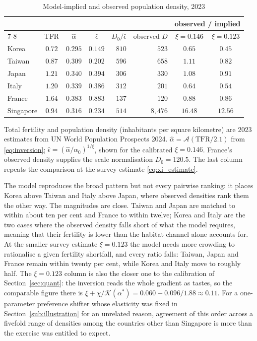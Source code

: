 \documentclass[11pt]{article}
\begin{document}
\begin{table}[h!]\centering
\begin{threeparttable}
\caption{Model-implied and observed population density, 2023}
\label{tab:crosscountry}
\begin{tabular}{lcccrrcc}
\toprule
& & & & & & \multicolumn{2}{c}{observed / implied}\\
\cmidrule(lr){7-8}
& TFR & $\hat\alpha$ & $\hat\epsilon$ & $D_0/\hat\epsilon$ & observed $D$ & $\xi=0.146$ & $\xi=0.123$\\
\midrule
Korea       & $0.72$ & $0.295$ & $0.149$ & $810$ & $523$  & $0.65$ & $0.45$\\
Taiwan      & $0.87$ & $0.309$ & $0.202$ & $596$ & $658$  & $1.11$ & $0.82$\\
Japan       & $1.21$ & $0.340$ & $0.394$ & $306$ & $330$  & $1.08$ & $0.91$\\
Italy       & $1.20$ & $0.339$ & $0.386$ & $312$ & $201$  & $0.64$ & $0.54$\\
France      & $1.64$ & $0.383$ & $0.883$ & $137$ & $120$  & $0.88$ & $0.86$\\
Singapore   & $0.94$ & $0.316$ & $0.234$ & $514$ & $8{,}476$ & $16.48$ & $12.56$\\
\bottomrule
\end{tabular}
\begin{tablenotes}\footnotesize
\item Total fertility and population density (inhabitants per square kilometre) are 2023 estimates
from UN World Population Prospects 2024. $\hat\alpha=\mathcal{A}(\text{TFR}/2.1)$ from
\eqref{eq:inversion}; $\hat\epsilon=(\hat\alpha/\alpha_0)^{1/\xi}$, shown for the calibrated
$\xi=0.146$. France's observed density supplies the scale normalisation $D_0=120.5$. The last column repeats the comparison at
the survey estimate \eqref{eq:xi_estimate}.
\end{tablenotes}
\end{threeparttable}
\end{table}

The model reproduces the broad pattern but not every pairwise ranking: it places Korea above Taiwan and Italy above Japan, where observed densities rank them the other way. The magnitudes are close. Taiwan and Japan are matched to
within about ten per cent and France to within twelve; Korea and Italy are the two cases where the
observed density falls short of what the model requires, meaning that their fertility is lower than
the habitat channel alone accounts for. At the smaller survey estimate $\xi=0.123$ the model needs
more crowding to rationalise a given fertility shortfall, and every ratio falls: Taiwan, Japan and
France remain within twenty per cent, while Korea and Italy move to roughly half. The $\xi=0.123$ column is also the closer one to the
calibration of Section~\ref{sec:quant}: the inversion reads the whole gradient as tastes, so the
comparable figure there is $\xi+\chi/\mathcal{K}(\alpha^\ast)=0.060+0.096/1.88\approx0.11$. For a one-parameter preference shifter whose elasticity was
fixed in Section~\ref{sub:illustration} for an unrelated reason, agreement of this order across a
fivefold range of densities among the countries other than Singapore is more than the exercise was entitled to expect.
\end{document}
